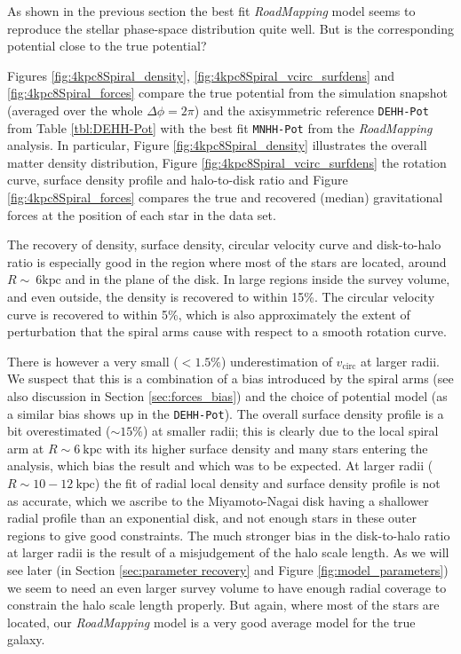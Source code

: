 \documentclass[iop,revtex4,numberedappendix,appendixfloats]{emulateapj}
\newcommand{\RM}{{\sl RoadMapping}}
\begin{document}
As shown in the previous section the best fit \RM{} model seems to reproduce the stellar phase-space distribution quite well. But is the corresponding potential close to the true potential? 

Figures \ref{fig:4kpc8Spiral_density}, \ref{fig:4kpc8Spiral_vcirc_surfdens} and \ref{fig:4kpc8Spiral_forces} compare the true potential from the simulation snapshot (averaged over the whole $\Delta\phi=2\pi$) and the axisymmetric reference \texttt{DEHH-Pot} from Table \ref{tbl:DEHH-Pot} with the best fit \texttt{MNHH-Pot} from the \RM{} analysis. In particular, Figure \ref{fig:4kpc8Spiral_density} illustrates the overall matter density distribution, Figure \ref{fig:4kpc8Spiral_vcirc_surfdens} the rotation curve, surface density profile and halo-to-disk ratio and Figure \ref{fig:4kpc8Spiral_forces} compares the true and recovered (median) gravitational forces at the position of each star in the data set.

The recovery of density, surface density, circular velocity curve and disk-to-halo ratio is especially good in the region where most of the stars are located, around $R\sim~6\text{kpc}$ and in the plane of the disk. In large regions inside the survey volume, and even outside, the density is recovered to within 15\%. The circular velocity curve is recovered to within 5\%, which is also approximately the extent of perturbation that the spiral arms cause with respect to a smooth rotation curve.

There is however a very small ($<1.5\%$) underestimation of $v_\text{circ}$ at larger radii. We suspect that this is a combination of a bias introduced by the spiral arms (see also discussion in Section \ref{sec:forces_bias}) and the choice of potential model (as a similar bias shows up in the \texttt{DEHH-Pot}). The overall surface density profile is a bit overestimated ($\sim 15\%$) at smaller radii; this is clearly due to the local spiral arm at $R\sim6~\text{kpc}$ with its higher surface density and many stars entering the analysis, which bias the result and which was to be expected. At larger radii ($R\sim10-12~\text{kpc}$) the fit of radial local density and surface density profile is not as accurate, which we ascribe to the Miyamoto-Nagai disk having a shallower radial profile than an exponential disk, and not enough stars in these outer regions to give good constraints. The much stronger bias in the disk-to-halo ratio at larger radii is the result of a misjudgement of the halo scale length. As we will see later (in Section \ref{sec:parameter recovery} and Figure \ref{fig:model_parameters}) we seem to need an even larger survey volume to have enough radial coverage to constrain the halo scale length properly. But again, where most of the stars are located, our \RM{} model is a very good average model for the true galaxy.
\end{document}
